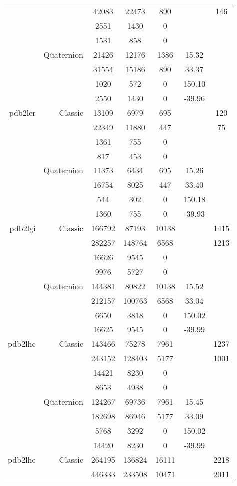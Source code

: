 \begin{xltabular}{\textwidth}{r|rcccSc}
& & 42083 & 22473 & 890 & & 146 \\
& & 2551 & 1430 & 0 & & \\
& & 1531 & 858 & 0 & & \\
& Quaternion & 21426 & 12176 & 1386 & 15.32 & \\
& & 31554 & 15186 & 890 & 33.37 & \\
& & 1020 & 572 & 0 & 150.10 & \\
& & 2550 & 1430 & 0 & -39.96 & \\ \addlinespace
pdb2ler & Classic & 13109 & 6979 & 695 & & 120 \\
& & 22349 & 11880 & 447 & & 75 \\
& & 1361 & 755 & 0 & & \\
& & 817 & 453 & 0 & & \\
& Quaternion & 11373 & 6434 & 695 & 15.26 & \\
& & 16754 & 8025 & 447 & 33.40 & \\
& & 544 & 302 & 0 & 150.18 & \\
& & 1360 & 755 & 0 & -39.93 & \\ \addlinespace
pdb2lgi & Classic & 166792 & 87193 & 10138 & & 1415 \\
& & 282257 & 148764 & 6568 & & 1213 \\
& & 16626 & 9545 & 0 & & \\
& & 9976 & 5727 & 0 & & \\
& Quaternion & 144381 & 80822 & 10138 & 15.52 & \\
& & 212157 & 100763 & 6568 & 33.04 & \\
& & 6650 & 3818 & 0 & 150.02 & \\
& & 16625 & 9545 & 0 & -39.99 & \\ \addlinespace
pdb2lhc & Classic & 143466 & 75278 & 7961 & & 1237 \\
& & 243152 & 128403 & 5177 & & 1001 \\
& & 14421 & 8230 & 0 & & \\
& & 8653 & 4938 & 0 & & \\
& Quaternion & 124267 & 69736 & 7961 & 15.45 & \\
& & 182698 & 86946 & 5177 & 33.09 & \\
& & 5768 & 3292 & 0 & 150.02 & \\
& & 14420 & 8230 & 0 & -39.99 & \\ \addlinespace
pdb2lhe & Classic & 264195 & 136824 & 16111 & & 2218 \\
& & 446333 & 233508 & 10471 & & 2011 \\

\end{xltabular}
